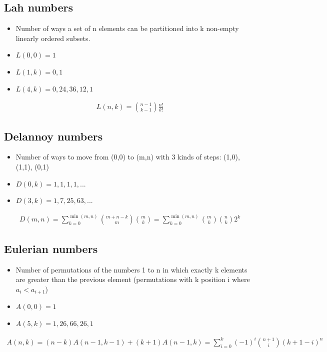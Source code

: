 \subsection{Lah numbers}
\begin{itemize}
    \item Number of ways a set of n elements can be partitioned into k non-empty linearly ordered subsets.
    \item $L(0, 0) = 1$
    \item $L(1, k) = 0, 1$
    \item $L(4, k) = 0, 24, 36, 12, 1$
\end{itemize}
\begin{align*}
    L(n, k) = \binom{n-1}{k-1} \frac{n!}{k!}
\end{align*}

\subsection{Delannoy numbers}
\begin{itemize}
    \item Number of ways to move from (0,0) to (m,n) with 3 kinds of steps: (1,0), (1,1), (0,1)
    \item $D(0, k) = 1, 1, 1, 1, ...$
    \item $D(3, k) = 1, 7, 25, 63, ...$
\end{itemize}
\begin{align*}
    D(m,n) = \sum_{k=0}^{\min(m,n)} \binom{m+n-k}{m} \binom{m}{k} = \sum_{k=0}^{\min(m,n)} \binom{m}{k} \binom{n}{k} 2^k
\end{align*}

\subsection{Eulerian numbers}
\begin{itemize}
    \item Number of permutations of the numbers 1 to n in which exactly k elements are greater than the previous element (permutations with k position i where $a_i < a_{i + 1}$)
    \item $A(0, 0) = 1$
    \item $A(5, k) = 1, 26, 66, 26, 1$
\end{itemize}
\begin{align*}
    A(n,k) = (n - k)A(n-1, k-1) + (k+1)A(n-1, k) = \sum_{i=0}^{k} (-1)^i \binom{n+1}{i}(k+1-i)^n
\end{align*}

